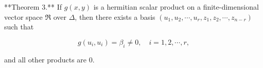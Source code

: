 **Theorem 3.** If $g(x, y)$ is a hermitian scalar product on a finite-dimensional vector space $\Re$ over $\Delta$, then there exists a basis $(u_1, u_2, \cdots, u_r, z_1, z_2, \cdots, z_{n-r})$ such that

$$g(u_i, u_i) = \beta_i \neq 0, \quad i = 1, 2, \cdots, r,$$

and all other products are $0$.
